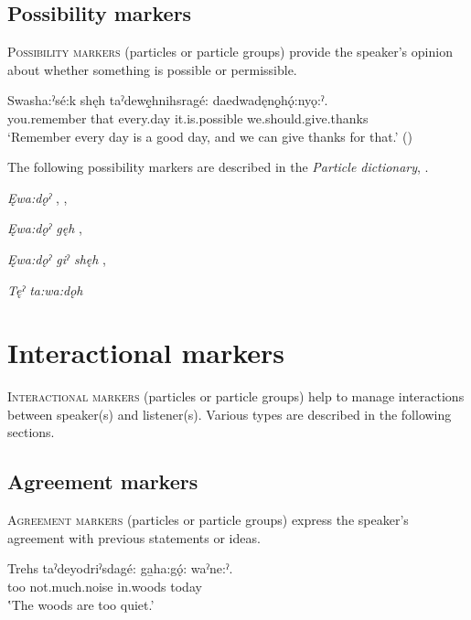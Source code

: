 \subsection{Possibility markers} \label{ch:Possibility markers}
\textsc{Possibility markers} (particles or particle groups) provide the speaker’s opinion about whether something is possible or permissible. 

\ea\label{ex:possibility1}
 \gll Swasha:ˀsé:k shęh taˀdewę̱hnihsragé:  daedwadęnǫ̱hǫ́:nyǫ:ˀ. \\
you.remember that every.day it.is.possible we.should.give.thanks\\
\glt ‘Remember every day is a good day, and we can give thanks for that.’ (\cite{carrier_legends_2013})
\z

The following possibility markers are described in the \textit{Particle dictionary}, .

\begin{CayugaRelated}
\item{}\textit{Ęwa:dǫˀ} , , \\
\item{}\textit{Ęwa:dǫˀ gęh} , \\
\item{}\textit{Ęwa:dǫˀ giˀ shęh} , \\
\item{}\textit{Tęˀ ta:wa:dǫh} 
\end{CayugaRelated}



\section{Interactional markers} \label{ch:Interactional markers}
\textsc{Interactional markers} (particles or particle groups) help to manage interactions between speaker(s) and listener(s). Various types are described in the following sections.

\subsection{Agreement markers} \label{ch:Agreement markers}
\textsc{Agreement markers} (particles or particle groups) express the speaker’s agreement with previous statements or ideas. 

\ea\label{ex:agreement1}
\gll Trehs taˀdeyodriˀsdagé: ga̱ha:gǫ́: waˀne:ˀ.\\
too not.much.noise in.woods today\\
\glt ‛The woods are too quiet.’

